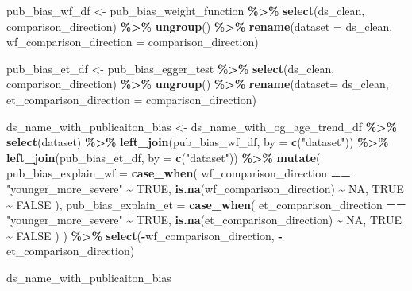 \documentclass[
]{article}
\newenvironment{Shaded}{\begin{snugshade}}{\end{snugshade}}
\newcommand{\AttributeTok}[1]{\textcolor[rgb]{0.13,0.29,0.53}{#1}}
\newcommand{\ConstantTok}[1]{\textcolor[rgb]{0.56,0.35,0.01}{#1}}
\newcommand{\FunctionTok}[1]{\textcolor[rgb]{0.13,0.29,0.53}{\textbf{#1}}}
\newcommand{\NormalTok}[1]{#1}
\newcommand{\OtherTok}[1]{\textcolor[rgb]{0.56,0.35,0.01}{#1}}
\newcommand{\SpecialCharTok}[1]{\textcolor[rgb]{0.81,0.36,0.00}{\textbf{#1}}}
\newcommand{\StringTok}[1]{\textcolor[rgb]{0.31,0.60,0.02}{#1}}
\begin{document}
\begin{Shaded}
\begin{Highlighting}[]
\NormalTok{pub\_bias\_wf\_df }\OtherTok{\textless{}{-}}\NormalTok{ pub\_bias\_weight\_function }\SpecialCharTok{\%\textgreater{}\%} 
  \FunctionTok{select}\NormalTok{(ds\_clean, comparison\_direction) }\SpecialCharTok{\%\textgreater{}\%} 
  \FunctionTok{ungroup}\NormalTok{() }\SpecialCharTok{\%\textgreater{}\%} 
  \FunctionTok{rename}\NormalTok{(}\AttributeTok{dataset =}\NormalTok{ ds\_clean, }
         \AttributeTok{wf\_comparison\_direction =}\NormalTok{ comparison\_direction)}

\NormalTok{pub\_bias\_et\_df }\OtherTok{\textless{}{-}}\NormalTok{ pub\_bias\_egger\_test }\SpecialCharTok{\%\textgreater{}\%} 
  \FunctionTok{select}\NormalTok{(ds\_clean, comparison\_direction) }\SpecialCharTok{\%\textgreater{}\%} 
  \FunctionTok{ungroup}\NormalTok{() }\SpecialCharTok{\%\textgreater{}\%} 
  \FunctionTok{rename}\NormalTok{(}\AttributeTok{dataset=}\NormalTok{ ds\_clean, }
         \AttributeTok{et\_comparison\_direction =}\NormalTok{ comparison\_direction)}

\NormalTok{ds\_name\_with\_publicaiton\_bias }\OtherTok{\textless{}{-}}\NormalTok{ ds\_name\_with\_og\_age\_trend\_df }\SpecialCharTok{\%\textgreater{}\%} 
  \FunctionTok{select}\NormalTok{(dataset) }\SpecialCharTok{\%\textgreater{}\%} 
  \FunctionTok{left\_join}\NormalTok{(pub\_bias\_wf\_df, }\AttributeTok{by =} \FunctionTok{c}\NormalTok{(}\StringTok{"dataset"}\NormalTok{)) }\SpecialCharTok{\%\textgreater{}\%} 
  \FunctionTok{left\_join}\NormalTok{(pub\_bias\_et\_df, }\AttributeTok{by =} \FunctionTok{c}\NormalTok{(}\StringTok{"dataset"}\NormalTok{)) }\SpecialCharTok{\%\textgreater{}\%} 
  \FunctionTok{mutate}\NormalTok{(}
    \AttributeTok{pub\_bias\_explain\_wf =} \FunctionTok{case\_when}\NormalTok{(}
\NormalTok{      wf\_comparison\_direction }\SpecialCharTok{==} \StringTok{"younger\_more\_severe"} \SpecialCharTok{\textasciitilde{}} \ConstantTok{TRUE}\NormalTok{, }
      \FunctionTok{is.na}\NormalTok{(wf\_comparison\_direction) }\SpecialCharTok{\textasciitilde{}} \ConstantTok{NA}\NormalTok{,}
      \ConstantTok{TRUE} \SpecialCharTok{\textasciitilde{}} \ConstantTok{FALSE}
\NormalTok{    ),}
    \AttributeTok{pub\_bias\_explain\_et =} \FunctionTok{case\_when}\NormalTok{(}
\NormalTok{      et\_comparison\_direction }\SpecialCharTok{==} \StringTok{"younger\_more\_severe"} \SpecialCharTok{\textasciitilde{}} \ConstantTok{TRUE}\NormalTok{, }
      \FunctionTok{is.na}\NormalTok{(et\_comparison\_direction) }\SpecialCharTok{\textasciitilde{}} \ConstantTok{NA}\NormalTok{,}
      \ConstantTok{TRUE} \SpecialCharTok{\textasciitilde{}} \ConstantTok{FALSE}
\NormalTok{    )}
\NormalTok{  ) }\SpecialCharTok{\%\textgreater{}\%} 
  \FunctionTok{select}\NormalTok{(}\SpecialCharTok{{-}}\NormalTok{wf\_comparison\_direction, }\SpecialCharTok{{-}}\NormalTok{et\_comparison\_direction)}
  
\NormalTok{ds\_name\_with\_publicaiton\_bias}
\end{Highlighting}
\end{Shaded}
\end{document}
